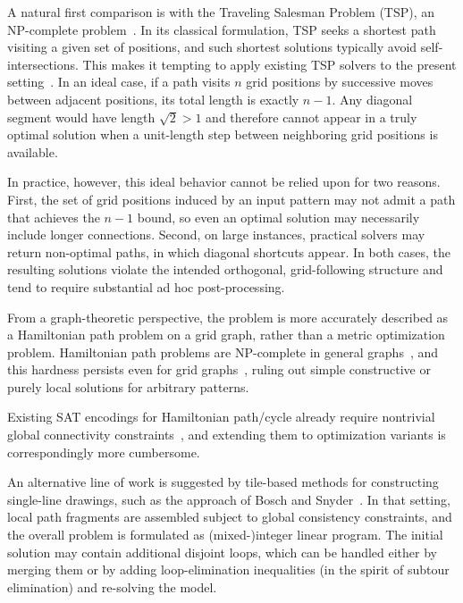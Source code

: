 \documentclass[acmsmall,screen,nonacm]{acmart}
\begin{document}
A natural first comparison is with the Traveling Salesman Problem
(TSP), an NP-complete problem~\cite{Papadimitriou1977EuclidTSP}. In
its classical formulation, TSP seeks a shortest path visiting a given
set of positions, and such shortest solutions typically avoid
self-intersections. This makes it tempting to apply existing TSP
solvers to the present setting~\cite{Cook2012InPursuit}. In an ideal
case, if a path visits \(n\) grid positions by successive moves
between adjacent positions, its total length is exactly \(n-1\). Any
diagonal segment would have length \(\sqrt{2}>1\) and therefore cannot
appear in a truly optimal solution when a unit-length step between
neighboring grid positions is available.

In practice, however, this ideal behavior cannot be relied upon for
two reasons. First, the set of grid positions induced by an input
pattern may not admit a path that achieves the \(n-1\) bound, so even
an optimal solution may necessarily include longer
connections. Second, on large instances, practical solvers may return
non-optimal paths, in which diagonal shortcuts appear. In both cases,
the resulting solutions violate the intended orthogonal,
grid-following structure and tend to require substantial ad hoc
post-processing.

From a graph-theoretic perspective, the problem is more accurately
described as a Hamiltonian path problem on a grid graph, rather than a
metric optimization problem. Hamiltonian path problems are NP-complete
in general graphs~\cite{GareyJohnson1979}, and this hardness persists
even for grid graphs~\cite{hamiltonGrid}, ruling out simple
constructive or purely local solutions for arbitrary patterns.

Existing SAT encodings for Hamiltonian path/cycle already require
nontrivial global connectivity
constraints~\cite{Zhou2020EfficientSAT}, and extending them to
optimization variants is correspondingly more cumbersome.

An alternative line of work is suggested by tile-based methods for
constructing single-line drawings, such as the approach of Bosch and
Snyder~\cite{BoschSnyder2023TileBasedSingleLine}. In that setting,
local path fragments are assembled subject to global consistency
constraints, and the overall problem is formulated as (mixed-)integer
linear program. The initial solution may contain additional disjoint
loops, which can be handled either by merging them or by adding
loop-elimination inequalities (in the spirit of subtour elimination)
and re-solving the model.
\end{document}
